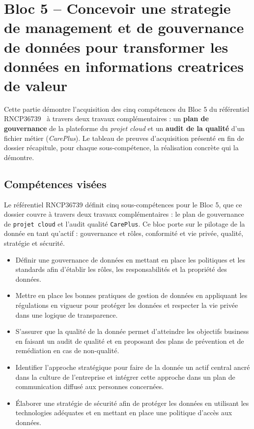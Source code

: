 \documentclass{article}
\begin{document}
\newpage
\section{Bloc 5 -- Concevoir une strategie de management et de gouvernance de données pour transformer les données en informations creatrices de valeur}

Cette partie démontre l'acquisition des cinq compétences du Bloc 5 du référentiel
RNCP36739~\cite{rncp} à travers deux travaux complémentaires : un \textbf{plan de
gouvernance} de la plateforme du \textit{projet cloud} et un \textbf{audit de
la qualité} d'un fichier métier (\textit{CarePlus}). Le tableau de preuves
d'acquisition présenté en fin de dossier récapitule, pour chaque sous-compétence, la
réalisation concrète qui la démontre.

\subsection{Compétences visées}

Le référentiel RNCP36739 définit cinq sous-compétences pour le Bloc 5, que ce dossier
couvre à travers deux travaux complémentaires : le plan de gouvernance de
\texttt{projet cloud} et l'audit qualité \texttt{CarePlus}. Ce bloc porte sur le
pilotage de la donnée en tant qu'actif : gouvernance et rôles, conformité et vie
privée, qualité, stratégie et sécurité.

\begin{itemize}
    \item Définir une gouvernance de données en mettant en place les politiques et
          les standards afin d'établir les rôles, les responsabilités et la propriété des
          données.
    \item Mettre en place les bonnes pratiques de gestion de données en appliquant
          les régulations en vigueur pour protéger les données et respecter la vie privée
          dans une logique de transparence.
    \item S'assurer que la qualité de la donnée permet d'atteindre les objectifs
          business en faisant un audit de qualité et en proposant des plans de prévention
          et de remédiation en cas de non-qualité.
    \item Identifier l'approche stratégique pour faire de la donnée un actif central
          ancré dans la culture de l'entreprise et intégrer cette approche dans un plan de
          communication diffusé aux personnes concernées.
    \item Élaborer une stratégie de sécurité afin de protéger les données en
          utilisant les technologies adéquates et en mettant en place une politique
          d'accès aux données.
\end{itemize}
\end{document}
